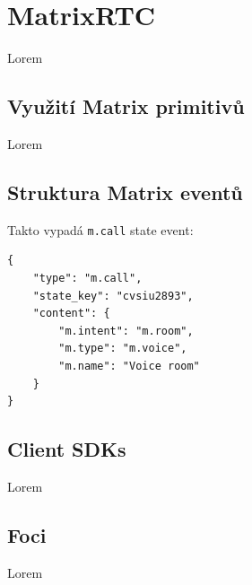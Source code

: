 \section{MatrixRTC}\label{matrixRTC}

Lorem

\subsection{Využití Matrix primitivů}

Lorem

\subsection{Struktura Matrix eventů}

Takto vypadá \texttt{m.call} state event:

\begin{verbatim}
{
	"type": "m.call",
	"state_key": "cvsiu2893",
	"content": {
		"m.intent": "m.room",
		"m.type": "m.voice",
		"m.name": "Voice room"
	}
}
\end{verbatim}

\subsection{Client SDKs}

Lorem

\subsection{Foci}

Lorem
